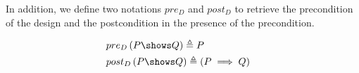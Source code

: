 In addition, we define two notations $pre_D$ and $post_D$ to retrieve the precondition of the design and the postcondition in the presence of the precondition. 
\begin{definition}
    \begin{align*}
        & pre_D\left(\design{P}{Q}\right) \defs P & \\
        & post_D\left(\design{P}{Q}\right) \defs \left(P \implies Q\right) & \\
    \end{align*}
\end{definition}

